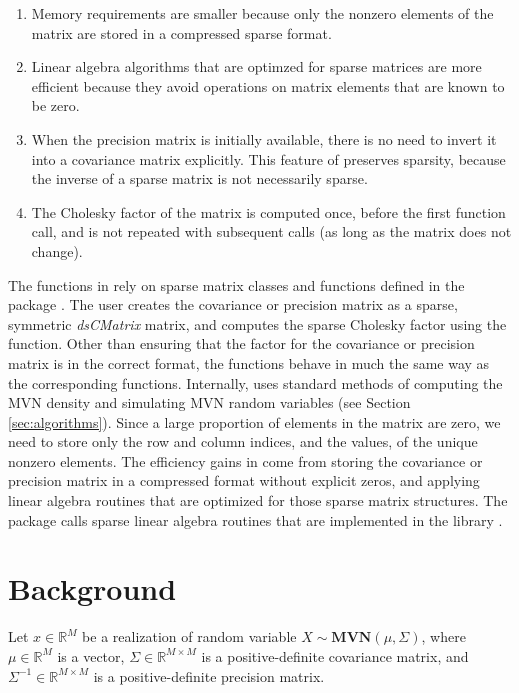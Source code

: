 \documentclass[codesnippet,nojss]{jss}\usepackage[]{graphicx}\usepackage[]{color}
\newcommand{\func}[1]{\code{#1}}
\newcommand{\class}[1]{\textsl{#1}}
\newcommand{\MVN}[1]{\mathbf{MVN}\!\left(#1\right)}
\newcommand{\Real}[1]{\mathbb{R}^{#1}}
\begin{document}
\begin{enumerate}
\item Memory requirements are smaller because only the nonzero
  elements of the matrix are stored in a compressed sparse format.
\item Linear algebra algorithms that are optimzed for sparse matrices
  are more efficient because they avoid operations on matrix elements that are known to be zero.
\item When the precision matrix is initially available,
  there is no need to invert it into a covariance matrix explicitly.
  This feature of  preserves sparsity, because the inverse of a sparse matrix is
  not necessarily sparse.
\item The Cholesky factor of the matrix is computed once, before the
  first  function call, and is not repeated with subsequent calls
  (as long as the matrix does not change).
\end{enumerate}


The functions in  rely on sparse matrix classes and
functions defined in the  package
\citep{R_Matrix}.  The user creates the covariance or precision matrix
as a sparse, symmetric \class{dsCMatrix} matrix, and computes the
sparse Cholesky factor using the \func{Cholesky} function. Other than ensuring that
the factor for the covariance or precision matrix is in the correct
format, the  functions behave
in much the same way as the corresponding  functions.
Internally,  uses
standard methods of computing the MVN density and simulating MVN
random variables (see Section \ref{sec:algorithms}).  Since a large
proportion of elements in the matrix are zero, we need
to store only the row and column indices, and the values, of the
unique nonzero elements.  The efficiency gains in  come from
storing the covariance or precision matrix in a compressed format without
explicit zeros, and applying linear algebra routines that are
optimized for those sparse matrix structures.  The 
package calls sparse linear algebra routines that are implemented in
the  library
\citep{ChenDavis2008,DavisHager1999,DavisHager2009}.



\section{Background}
Let $x\in\Real{M}$ be a realization of random variable
$X\sim\MVN{\mu,\Sigma}$, where $\mu\in\Real{M}$ is a vector,
$\Sigma\in\Real{M\times M}$ is a positive-definite covariance matrix,
and $\Sigma^{-1}\in\Real{M\times M}$ is a positive-definite precision matrix.
\end{document}
